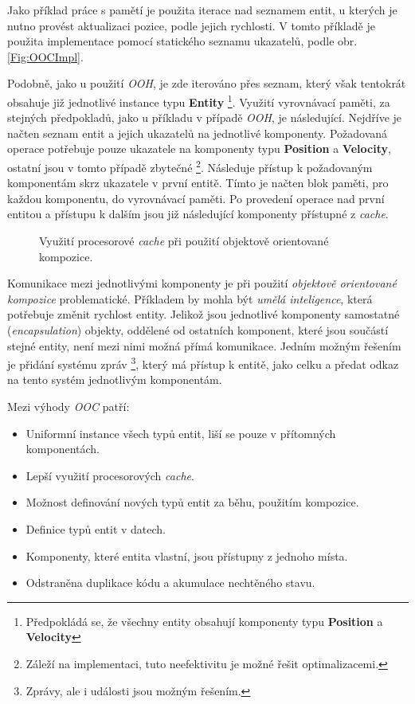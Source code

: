 Jako příklad práce s pamětí je použita iterace nad seznamem entit, u kterých je nutno provést aktualizaci pozice, podle jejich rychlosti. V tomto příkladě je použita implementace pomocí statického seznamu ukazatelů, podle obr. \ref{Fig:OOCImpl}.

Podobně, jako u použití \emph{OOH}, je zde iterováno přes seznam, který však tentokrát obsahuje již jednotlivé instance typu \textbf{Entity} \footnote{Předpokládá se, že všechny entity obsahují komponenty typu \textbf{Position} a \textbf{Velocity}}. Využití vyrovnávací paměti, za stejných předpokladů, jako u příkladu v případě \emph{OOH}, je následující. Nejdříve je načten seznam entit a jejich ukazatelů na jednotlivé komponenty. Požadovaná operace potřebuje pouze ukazatele na komponenty typu \textbf{Position} a \textbf{Velocity}, ostatní jsou v tomto případě zbytečné \footnote{Záleží na implementaci, tuto neefektivitu je možné řešit optimalizacemi. }. Následuje přístup k požadovaným komponentám skrz ukazatele v první entitě. Tímto je načten blok paměti, pro každou komponentu, do vyrovnávací paměti. Po provedení operace nad první entitou a přístupu k dalším jsou již následující komponenty přístupné z \emph{cache}. 

\begin{figure}
	\caption{Využití procesorové \emph{cache} při použití objektově orientované kompozice.}
	\label{Fig:OOCCache}
\end{figure}

Komunikace mezi jednotlivými komponenty je při použití \emph{objektově orientované kompozice} problematické. Příkladem by mohla být \emph{umělá inteligence}, která potřebuje změnit rychlost entity. Jelikož jsou jednotlivé komponenty samostatné (\emph{encapsulation}) objekty, oddělené od ostatních komponent, které jsou součástí stejné entity, není mezi nimi možná přímá komunikace. Jedním možným řešením je přidání systému zpráv \footnote{Zprávy, ale i události jsou možným řešením.}, který má přístup k entitě, jako celku a předat odkaz na tento systém jednotlivým komponentám.

\noindent Mezi výhody \emph{OOC} patří: 
\begin{itemize}
	\item Uniformní instance všech typů entit, liší se pouze v přítomných komponentách.
	\item Lepší využití procesorových \emph{cache}.
	\item Možnost definování nových typů entit za běhu, použitím kompozice.
	\item Definice typů entit v datech.
	\item Komponenty, které entita vlastní, jsou přístupny z jednoho místa.
	\item Odstraněna duplikace kódu a akumulace nechtěného stavu.
\end{itemize}

